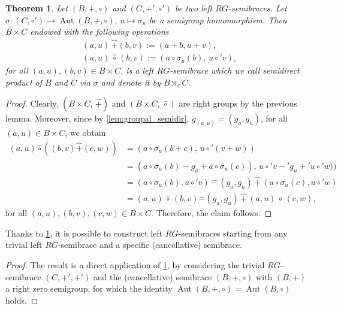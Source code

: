 \documentclass[11pt]{amsart}
\newcommand{\Aut}{\operatorname{Aut}}
\newtheorem{theorem}{Theorem}[section]
\newtheorem{corollary}[theorem]{Corollary}
\theoremstyle{definition}
\begin{document}
\begin{theorem}\label{semidirect}
   Let $(B, +, \circ)$ and $(C, +', \circ')$ be two left $RG$-semibraces. Let $\sigma: (C, \circ') \to \Aut(B, +, \circ), \, u \mapsto \sigma_u$ be a semigroup homomorphism.
   Then $B\times C$ endowed with the following operations
\begin{align*}
&(a, u) \, \hat{+} (b, v) := (a+b, u+v),\\
&(a,u) \, \hat{\circ}\, (b,v) := \left(a\circ\sigma_u(b), \, u\circ'v \right),
\end{align*}
for all $(a,u), (b,v)\in B\times C$, is a left $RG$-semibrace which we call \emph{semidirect product of $B$ and $C$ via $\sigma$
} and denote it by $B \rtimes_\sigma C$.
\end{theorem}
\begin{proof}
    Clearly, $(B\times C, \, \hat{+})$ and $(B\times C, \, \hat{\circ})$ are right groups by the previous lemma. 
    Moreover, since by \cref{lem:groupal_semidir}, $g_{(a,u)} = (g_a, g_u)$, for all $(a,u)\in B\times C$, we obtain
    \begin{align*}
        (a,u)\hat{\circ}\left((b,v)\hat{+}(c,w)\right)
        &= (a\circ\sigma_u(b+c),\, u\circ'(v+w))\\
        &= (a\circ\sigma_u(b) - g_a + a\circ\sigma_u(c)),\,
        u\circ' v -' g_u +' u \circ' w))\\
        &= (a\circ\sigma_u(b),u\circ' v) \, \hat{-} \, (g_a, g_u) \, \hat{+}   \,(a\circ\sigma_u(c),u\circ' w)\\
        &= (a,u)\,\hat{\circ}\,(b,v) \hat{-} (g_a, g_u) \,
        \hat{+} \, (a,u) \, \hat{\circ} \, (c,w),
    \end{align*}
    for all $(a,u),(b,v),(c,w)\in B\times C$.
    Therefore, the claim follows.
\end{proof}

\smallskip

Thanks to \cref{semidirect}, it is possible to construct left $RG$-semibraces starting from any trivial left $RG$-semibrace and a specific (cancellative) semibrace. 

\begin{proof}
 The result is a direct application of \cref{semidirect}, by considering the trivial $RG$-semibrace $\left(C,+',+'\right)$ and the (cancellative) semibrace $(B,+,\circ)$ with $(B,+)$ a right zero semigroup, for which the identity $\Aut(B, +, \circ)= \Aut(B, \circ)$ holds.
\end{proof}
\end{document}
